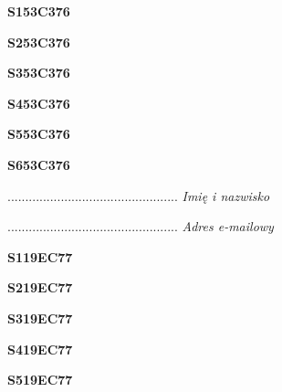 \begin{turn}{90}\huge \textbf{S153C376}\end{turn}

\begin{turn}{90}\huge \textbf{S253C376}\end{turn}

\begin{turn}{90}\huge \textbf{S353C376}\end{turn}

\begin{turn}{90}\huge \textbf{S453C376}\end{turn}

\begin{turn}{90}\huge \textbf{S553C376}\end{turn}

\begin{turn}{90}\huge \textbf{S653C376}\end{turn}

\begin{turn}{90}\begin{minipage}{\linewidth} \vspace{20mm} ................................................  \textit{Imię i nazwisko}\end{minipage}\end{turn}

\begin{turn}{90}\begin{minipage}{\linewidth} \vspace{20mm} ................................................  \textit{Adres e-mailowy}\end{minipage}\end{turn}

\begin{turn}{90}\huge \textbf{S119EC77}\end{turn}

\begin{turn}{90}\huge \textbf{S219EC77}\end{turn}

\begin{turn}{90}\huge \textbf{S319EC77}\end{turn}

\begin{turn}{90}\huge \textbf{S419EC77}\end{turn}

\begin{turn}{90}\huge \textbf{S519EC77}\end{turn}

